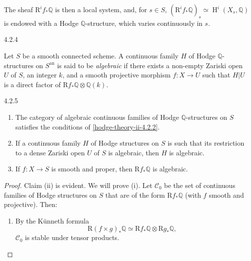   The sheaf \(\mathrm {R}^i f_*\mathbb {Q}\) is then a local system, and, for \(s\in  S\), \((\mathrm {R}^i f_*\mathbb {Q})_s\simeq \operatorname {H}^i(X_s,\mathbb {Q})\) is endowed with a Hodge \(\mathbb {Q}\)-structure, which varies continuously in \(s\).\begin{definition}{4.2.4}\label{hodge-theory-ii-4.2.4}\skipsinglepar\par{}Let \(S\) be a smooth connected scheme.
    A continuous family \(H\) of Hodge \(\mathbb {Q}\)-structures on \(S^\mathrm {an}\) is said to be \emph{algebraic} if there exists a non-empty Zariski open \(U\) of \(S\), an integer \(k\), and a smooth projective morphism \(f\colon  X\to  U\) such that \(H|U\) is a direct factor of \(\mathrm {R} f_*\mathbb {Q}\otimes \mathbb {Q}(k)\).\end{definition}\begin{proposition}{4.2.5}\label{hodge-theory-ii-4.2.5}\skipsinglepar\begin{enumerate}
    
 \item[(i)]
      The category of algebraic continuous families of Hodge \(\mathbb {Q}\)-structures on \(S\) satisfies the conditions of \cref{hodge-theory-ii-4.2.2}.
    

    
 \item[(ii)]
      If a continuous family \(H\) of Hodge structures on \(S\) is such that its restriction to a dense Zariski open \(U\) of \(S\) is algebraic, then \(H\) is algebraic.
    

    
 \item[(iii)]
      If \(f\colon  X\to  S\) is smooth and proper, then \(\mathrm {R} f_*\mathbb {Q}\) is algebraic.
    

  \end{enumerate}\begin{proof}\par{}Claim (ii) is evident.
      We will prove (i).
      Let \(\mathcal {C}_0\) be the set of continuous families of Hodge structures on \(S\) that are of the form \(\mathrm {R} f_*\mathbb {Q}\) (with \(f\) smooth and projective).
      Then:

      
 \begin{enumerate}
        
 \item[(a)]
          By the Künneth formula
          \[             \mathrm {R}(f\times  g)_*\mathbb {Q}             \simeq  \mathrm {R} f_*\mathbb {Q}\otimes \mathrm {R} g_*\mathbb {Q},           \]
          \(\mathcal {C}_0\) is stable under tensor products.
        


\end{enumerate}
\end{proof}
\end{proposition}
